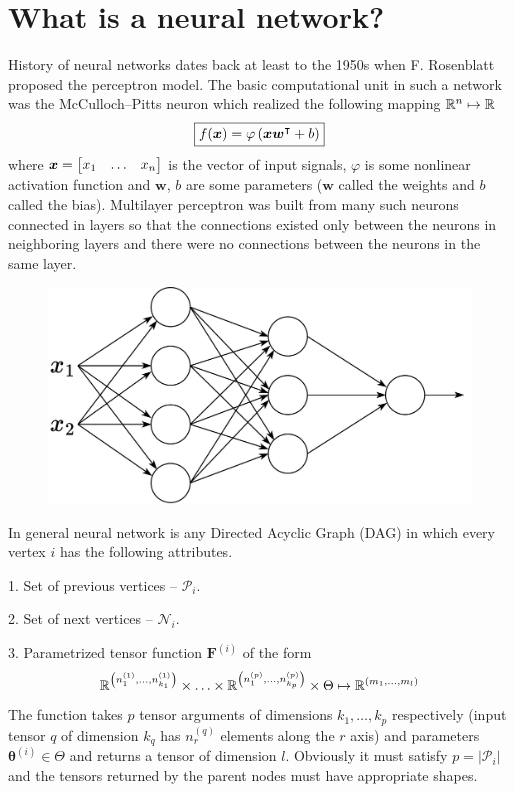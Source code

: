 \documentclass{myclass}
\begin{document}
\section{What is a neural network?}

History of neural networks dates back at least to the 1950s when F. Rosenblatt proposed the
perceptron model. The basic computational unit in such a network was the McCulloch--Pitts neuron
which realized the following mapping \(\mathbb{R}^n \mapsto \mathbb{R}\)
\[
\boxed
{
   f(\bm{x}) = \varphi \left( \bm{x} \bm{w}^\intercal + b \right)
}
\]
where \(\bm{x} = \mqty[x_1 & \ldots & x_n]\) is the vector of input signals, \(\varphi\) is some
nonlinear activation function and \(\bm{w}\), \(b\) are some parameters (\(\bm{w}\) called the
weights and \(b\) called the bias). Multilayer perceptron was built from many such neurons connected
in layers so that the connections existed only between the neurons in neighboring layers and there
were no connections between the neurons in the same layer. 

\begin{figure}[ht]
   \centering
   \includegraphics[width=0.85\columnwidth]{figs/nn.png}
\end{figure}

In general neural network is any Directed Acyclic Graph (DAG) in which every vertex \(i\) has the
following attributes.

\medskip

1. Set of previous vertices -- \(\mathscr{P}_i\).

\medskip

2. Set of next vertices -- \(\mathscr{N}_i\).

\medskip

3. Parametrized tensor function \(\bm{F}^{(i)}\) of the form
\[
   \mathbb{R}^{\left(n_{1}^{(1)}, \ldots, n_{k_1}^{(1)}\right)} \times \ldots \times  \mathbb{R}^{\left(n_{1}^{(p)}, \ldots, n_{k_p}^{(p)}\right)} \times \Theta \mapsto \mathbb{R}^{(m_1, \ldots, m_l)}
\]
The function takes \(p\) tensor arguments of dimensions \(k_1,\ldots,k_p\) respectively (input
tensor \(q\) of dimension \(k_q\) has \(n_{r}^{(q)}\) elements along the \(r\) axis) and parameters
\(\bm{\theta}^{(i)} \in \Theta\) and returns a tensor of dimension \(l\). Obviously it must satisfy
\(p = |\mathscr{P}_i|\) and the tensors returned by the parent nodes must have appropriate shapes.
\end{document}
